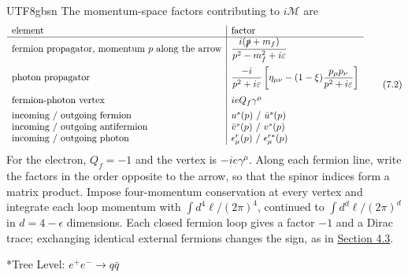 \documentclass[11pt,a4paper,oneside]{report}
\makeatletter
\newcommand\topic{\@startsection{paragraph}{4}{\z@}{-1.7ex plus -.3ex}{.5ex}{\normalfont\normalsize\bfseries\itshape\boldmath}*}
\makeatother
\begin{document}
\begin{CJK*}{UTF8}{gbsn}
The momentum-space factors contributing to $i\mathcal M$ are
\begin{equation*}
\begin{array}{l|l}
\text{element}&\text{factor}\\ \hline
\text{fermion propagator, momentum }p\text{ along the arrow}&\dfrac{i(\slashed{p}+m_f)}{p^2-m_f^2+i\varepsilon}\\[12pt]
\text{photon propagator}&\dfrac{-i}{p^2+i\varepsilon}\left[\eta_{\mu\nu}-(1-\xi)\dfrac{p_\mu p_\nu}{p^2+i\varepsilon}\right]\\[12pt]
\text{fermion-photon vertex}&ieQ_f\gamma^\mu\\[4pt]
\text{incoming / outgoing fermion}&u^s(p)\ /\ \bar u^s(p)\\
\text{incoming / outgoing antifermion}&\bar v^s(p)\ /\ v^s(p)\\
\text{incoming / outgoing photon}&\epsilon^r_\mu(p)\ /\ \epsilon^{r*}_\mu(p)
\end{array}
\tag{7.2}\label{eq:7.2}
\end{equation*}
For the electron, $Q_f=-1$ and the vertex is $-ie\gamma^\mu$. Along each fermion line, write the factors in the order opposite to the arrow, so that the spinor indices form a matrix product. Impose four-momentum conservation at every vertex and integrate each loop momentum with $\int d^4\ell/(2\pi)^4$, continued to $\int d^d\ell/(2\pi)^d$ in $d=4-\epsilon$ dimensions. Each closed fermion loop gives a factor $-1$ and a Dirac trace; exchanging identical external fermions changes the sign, as in \hyperref[feynman-diagrams]{Section 4.3}.

\topic{Tree Level: $e^+e^-\to q\bar q$}


\end{CJK*}
\end{document}

